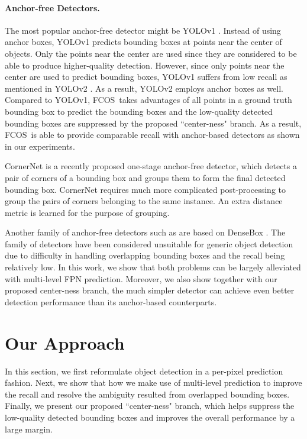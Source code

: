 \documentclass[10pt,twocolumn,letterpaper]{article}
\newcommand{\1}{{\mathbbm{1}}}           %
\def\Ours{{FCNDet}\xspace}
\def\Ours{{FCOS}\xspace}
\begin{document}
\paragraph{Anchor-free Detectors.} The most popular anchor-free detector might be 
YOLOv1 \cite{redmon2016you}. Instead of using anchor boxes, YOLOv1 predicts bounding boxes at points near the center of objects. Only the points near the center are used since they are considered to be able to produce higher-quality detection. However, since only points near the center are used to predict bounding boxes, YOLOv1 suffers from low recall as mentioned in YOLOv2 \cite{redmon2017yolo9000}. As a result, YOLOv2 \cite{redmon2017yolo9000} employs anchor boxes as well. Compared to YOLOv1, \Ours\ takes advantages of all points in a ground truth bounding box to predict the bounding boxes and the low-quality detected bounding boxes are suppressed by the proposed ``center-ness" branch.  As a result, \Ours\ is able to provide comparable recall with anchor-based detectors as shown in our experiments.



CornerNet \cite{law2018cornernet} is a recently proposed one-stage anchor-free detector, which detects a pair of corners of a bounding box and groups them to form the final detected bounding box. %
CornerNet requires much more complicated post-processing to group the pairs of corners belonging to the same instance. An extra distance metric is learned for the purpose of grouping.
%
%
%

Another family of anchor-free detectors such as \cite{yu2016unitbox} are based on DenseBox \cite{huang2015densebox}. %
 The family of detectors have been considered  unsuitable for generic object detection due to 
 difficulty in handling overlapping bounding boxes and  the recall being relatively low.
 In this work, we show that both problems can be largely alleviated  with multi-level FPN prediction. Moreover, we also show together with our proposed center-ness branch, the much simpler detector can achieve even better detection performance than its anchor-based counterparts.







\section{Our Approach}
In this section, we first reformulate object detection in a per-pixel prediction fashion. Next, we show that how we make use of multi-level prediction to improve the recall and resolve the ambiguity resulted from overlapped bounding boxes. Finally, we present our proposed ``center-ness" branch, which helps suppress the low-quality detected bounding boxes and improves the overall performance by a large margin.
\end{document}
